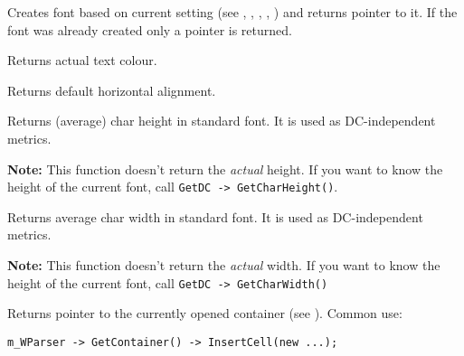 
Creates font based on current setting (see 
, 
, 
, 
, 
)
and returns pointer to it.
If the font was already created only a pointer is returned.


\label{wxhtmlwinparsergetactualcolor}


Returns actual text colour.

\label{wxhtmlwinparsergetalign}


Returns default horizontal alignment.

\label{wxhtmlwinparsergetcharheight}


Returns (average) char height in standard font. It is used as DC-independent metrics.

{\bf Note:} This function doesn't return the {\it actual} height. If you want to
know the height of the current font, call {\tt GetDC -> GetCharHeight()}.

\label{wxhtmlwinparsergetcharwidth}


Returns average char width in standard font. It is used as DC-independent metrics.

{\bf Note:} This function doesn't return the {\it actual} width. If you want to
know the height of the current font, call {\tt GetDC -> GetCharWidth()}

\label{wxhtmlwinparsergetcontainer}


Returns pointer to the currently opened container (see ).
Common use:

\begin{verbatim}
m_WParser -> GetContainer() -> InsertCell(new ...);
\end{verbatim}

